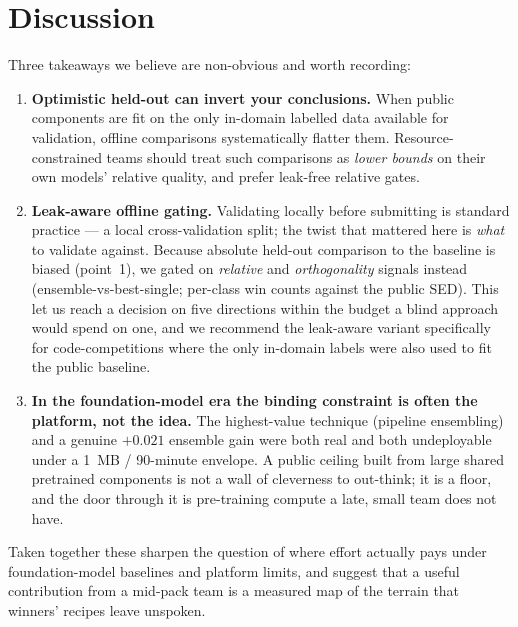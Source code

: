 \documentclass{ceurart}
\begin{document}
\section{Discussion}
\label{sec:discussion}

Three takeaways we believe are non-obvious and worth recording:

\begin{enumerate}
  \item \textbf{Optimistic held-out can invert your conclusions.} When public
        components are fit on the only in-domain labelled data available for
        validation, offline comparisons systematically flatter them.
        Resource-constrained teams should treat such comparisons as \emph{lower
        bounds} on their own models' relative quality, and prefer leak-free
        relative gates.
  \item \textbf{Leak-aware offline gating.} Validating locally before submitting is
        standard practice --- a local cross-validation split; the twist that
        mattered here is \emph{what} to validate against. Because absolute held-out
        comparison to the baseline is biased (point~1), we gated on \emph{relative}
        and \emph{orthogonality} signals instead (ensemble-vs-best-single; per-class
        win counts against the public SED). This let us reach a decision on five
        directions within the budget a blind approach would spend on one, and we
        recommend the leak-aware variant specifically for code-competitions where
        the only in-domain labels were also used to fit the public baseline.
  \item \textbf{In the foundation-model era the binding constraint is often the
        platform, not the idea.} The highest-value technique (pipeline ensembling)
        and a genuine $+0.021$ ensemble gain were both real and both undeployable
        under a 1~MB / 90-minute envelope. A public ceiling built from large shared
        pretrained components is not a wall of cleverness to out-think; it is a
        floor, and the door through it is pre-training compute a late, small team
        does not have.
\end{enumerate}

Taken together these sharpen the question of where effort actually pays under
foundation-model baselines and platform limits, and suggest that a useful
contribution from a mid-pack team is a measured map of the terrain that winners'
recipes leave unspoken.
\end{document}
